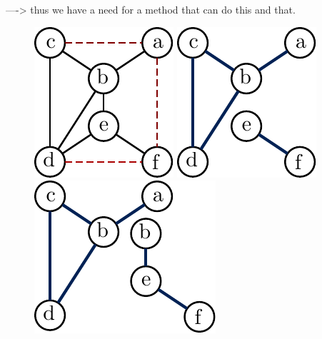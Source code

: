 \documentclass[conference,compsoc]{IEEEtran}
\begin{document}
----> thus we have a need for a method that can do this and that.


\begin{figure}
\centering
\begin{minipage}{.3\linewidth}
\centering
\includegraphics[scale=0.6]{images/interaction}
\end{minipage}%
\begin{minipage}{.3\linewidth}
\centering
\includegraphics[scale=0.6]{images/interaction_no_overlap}
\end{minipage}%
\begin{minipage}{.4\linewidth}
\centering
\includegraphics[scale=0.6]{images/interaction_overlap}
\end{minipage}
\captionsetup{font=small,margin=10pt}
\label{fig:minimal}
\end{figure}
\end{document}
